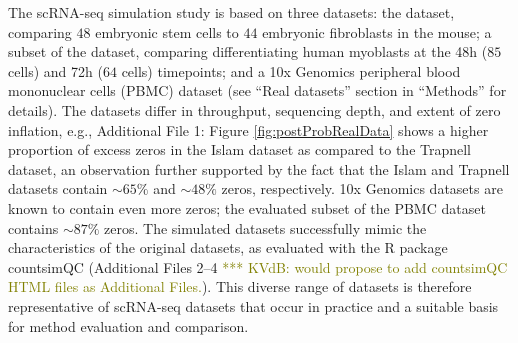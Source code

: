 \documentclass{bmcart}
\newcommand{\RPack}[1]{\textsf{#1}}
\newcommand{\fanny}[1]{\textcolor{blue}{*** FP: #1}}
\newcommand{\koen}[1]{\textcolor{olive}{*** KVdB: #1}}
\begin{document}
The scRNA-seq simulation study is based on three datasets: the \citet{Islam2011} dataset, comparing $48$ embryonic stem cells to $44$ embryonic fibroblasts in the mouse; a subset of the \citet{Trapnell2013} dataset, comparing differentiating human myoblasts at the 48h ($85$ cells) and 72h ($64$ cells) timepoints; and a 10x Genomics peripheral blood mononuclear cells (PBMC) dataset (see ``Real datasets'' section in ``Methods'' for details). The datasets differ in throughput, sequencing depth, and extent of zero inflation, e.g., Additional File 1: Figure \ref{fig:postProbRealData} shows a higher proportion of excess zeros in the Islam dataset as compared to the Trapnell dataset, an observation further supported by the fact that the Islam and Trapnell datasets contain $\sim 65\%$ and $\sim 48\%$ zeros, respectively. 
10x Genomics datasets are known to contain even more zeros; the evaluated subset of the PBMC dataset contains $\sim 87\%$ zeros. 
The simulated datasets successfully mimic the characteristics of the original datasets, as evaluated with the R package \RPack{countsimQC} \citep{Soneson2017a} (Additional Files 2--4 \koen{would propose to add countsimQC HTML files as Additional Files.}). This diverse range of datasets is therefore representative of scRNA-seq datasets that occur in practice and a suitable basis for method evaluation and comparison. 
\end{document}
